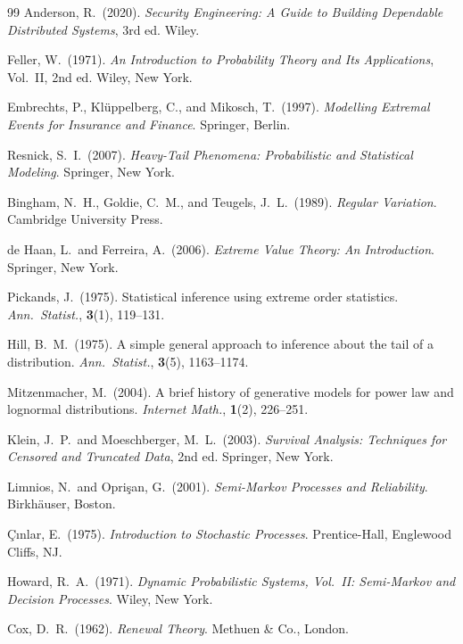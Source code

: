 \documentclass[12pt,a4paper]{article}
\theoremstyle{plain}
\theoremstyle{definition}
\theoremstyle{remark}
\begin{document}
\begin{thebibliography}{99}
Anderson, R.\ (2020).
\textit{Security Engineering: A Guide to Building Dependable Distributed Systems},
3rd ed.
Wiley.

Feller, W.\ (1971).
\textit{An Introduction to Probability Theory and Its Applications},
Vol.~II, 2nd ed.
Wiley, New York.

Embrechts, P., Kl{\"u}ppelberg, C., and Mikosch, T.\ (1997).
\textit{Modelling Extremal Events for Insurance and Finance}.
Springer, Berlin.

Resnick, S.\ I.\ (2007).
\textit{Heavy-Tail Phenomena: Probabilistic and Statistical Modeling}.
Springer, New York.

Bingham, N.\ H., Goldie, C.\ M., and Teugels, J.\ L.\ (1989).
\textit{Regular Variation}.
Cambridge University Press.

de Haan, L.\ and Ferreira, A.\ (2006).
\textit{Extreme Value Theory: An Introduction}.
Springer, New York.

Pickands, J.\ (1975).
Statistical inference using extreme order statistics.
\textit{Ann.\ Statist.}, \textbf{3}(1), 119--131.

Hill, B.\ M.\ (1975).
A simple general approach to inference about the tail of a distribution.
\textit{Ann.\ Statist.}, \textbf{3}(5), 1163--1174.

Mitzenmacher, M.\ (2004).
A brief history of generative models for power law and lognormal distributions.
\textit{Internet Math.}, \textbf{1}(2), 226--251.

Klein, J.\ P.\ and Moeschberger, M.\ L.\ (2003).
\textit{Survival Analysis: Techniques for Censored and Truncated Data},
2nd ed.
Springer, New York.

Limnios, N.\ and Opri\c{s}an, G.\ (2001).
\textit{Semi-Markov Processes and Reliability}.
Birkh{\"a}user, Boston.

{\c C}{\i}nlar, E.\ (1975).
\textit{Introduction to Stochastic Processes}.
Prentice-Hall, Englewood Cliffs, NJ.

Howard, R.\ A.\ (1971).
\textit{Dynamic Probabilistic Systems, Vol.~II: Semi-Markov and Decision Processes}.
Wiley, New York.

Cox, D.\ R.\ (1962).
\textit{Renewal Theory}.
Methuen \& Co., London.


\end{thebibliography}
\end{document}
